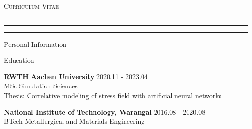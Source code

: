 \documentclass{cv}
\begin{document}
  
  
  \pagestyle{fancy}
  \fancyhf{}	%
  \fancyhead[L]{\fontsize{8}{8} \selectfont 
  }
  \fancyhead[R]{\fontsize{8}{8} \selectfont
  }
  \begin{center}{}
    {\textsc{\LARGE Curriculum Vitae}}\\
  \end{center}
  \vspace{0.15in}
  \hrule \vspace{0.5mm} \hrule\hrule
  \vspace{0.1in}
  

  \begin{rSection}{Personal Information}
    \begin{multicols}{2}
    \columnbreak
    \end{multicols}
  \end{rSection}

  \begin{rSection}{Education}
    \item {\bf RWTH Aachen University} \hfill {2020.11 - 2023.04}\\
    MSc Simulation Sciences\\
    Thesis: Correlative modeling of stress field with artificial neural networks
    
    \item {\bf National Institute of Technology, Warangal} \hfill {2016.08 - 2020.08} \\
    BTech Metallurgical and Materials Engineering\hfill \\
  \end{rSection}
\end{document}
